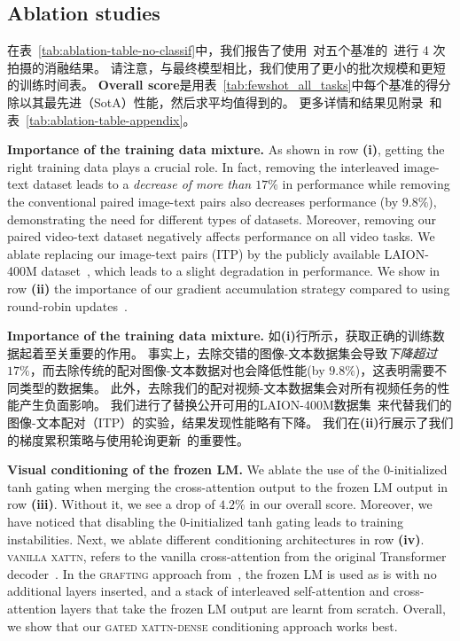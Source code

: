 

\subsection{Ablation studies}
\label{sec:ablations}



在表~\ref{tab:ablation-table-no-classif}中，我们报告了使用\base{}~对五个\dev{}基准的\metadevsubsets~进行 4 次拍摄的消融结果。
请注意，与最终模型相比，我们使用了更小的批次规模和更短的训练时间表。
\textbf{Overall score}是用表~\ref{tab:fewshot_all_tasks}中每个基准的得分除以其最先进（SotA）性能，然后求平均值得到的。
更多详情和结果见附录~和表~\ref{tab:ablation-table-appendix}。

\noindent
\textbf{Importance of the training data mixture.}
As shown in row \textbf{(i)}, getting the right training data plays a crucial role.
In fact, removing the interleaved image-text dataset \mmmw{} leads to a \emph{decrease of more than $17\%$} in performance while removing the conventional paired image-text pairs also decreases performance (by $9.8\%$), demonstrating the need for different types of datasets.
Moreover, removing our paired video-text dataset negatively affects performance on all video tasks.
We ablate replacing our image-text pairs (ITP) by the publicly available LAION-400M dataset~\cite{schuhmann2021laion}, which leads to a slight degradation in performance.
We show in row \textbf{(ii)} the importance of our gradient accumulation strategy compared to using round-robin updates~\citep{cho2021unifying}.

 \textbf{Importance of the training data mixture.}
 如\textbf{(i)}行所示，获取正确的训练数据起着至关重要的作用。 事实上，去除交错的图像-文本数据集\mmmw{}会导致\emph{下降超过$17\%$}，而去除传统的配对图像-文本数据对也会降低性能(by $9.8\%$)，这表明需要不同类型的数据集。
 此外，去除我们的配对视频-文本数据集会对所有视频任务的性能产生负面影响。 
 我们进行了替换公开可用的LAION-400M数据集~\cite{schuhmann2021laion}来代替我们的图像-文本配对（ITP）的实验，结果发现性能略有下降。 我们在\textbf{(ii)}行展示了我们的梯度累积策略与使用轮询更新~\citep{cho2021unifying}的重要性。

\noindent   
\textbf{Visual conditioning of the frozen LM.}
We ablate the use of the 0-initialized tanh gating when merging the cross-attention output to the frozen LM output in row \textbf{(iii)}.
Without it, we see a drop of $4.2\%$ in our overall score.
Moreover, we have noticed that disabling the 0-initialized tanh gating leads to training instabilities.
Next, we ablate different conditioning architectures in row \textbf{(iv)}.
\textsc{vanilla xattn}, refers to the vanilla cross-attention from the original Transformer decoder~\citep{vaswani2017attention}.
In the \textsc{grafting} approach from~\cite{luo2022vc}, the frozen LM is used as is with no additional layers inserted, and a stack of interleaved self-attention and cross-attention layers that take the frozen LM output are learnt from scratch.
Overall, we show that our \textsc{gated xattn-dense} conditioning approach works best.

